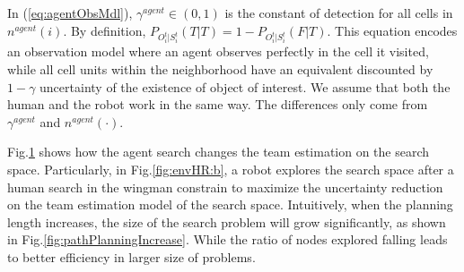 \documentclass[12pt]{article}
\begin{document}
In (\ref{eq:agentObsMdl}), $ \gamma^{agent} \in (0,1) $ is the constant of detection for all cells in $ n^{agent}(i) $. By definition, $ P_{O_{i}^{t}|S_{i}^{t}}(T|T) = 1 - P_{O_{i}^{t}|S_{i}^{t}}(F|T) $. This equation encodes an observation model where an agent observes perfectly in the cell it visited, while all cell units within the neighborhood have an equivalent discounted by $ 1-\gamma $ uncertainty of the existence of object of interest. We assume that both the human and the robot work in the same way. The differences only come from $ \gamma^{agent} $ and $ n^{agent}(\cdot) $.

\begin{figure} 
  \centering 
  \caption{} 
  \label{fig:envHR} %
\end{figure}

Fig.\ref{fig:envHR} shows how the agent search changes the team estimation on the search space. Particularly, in Fig.\ref{fig:envHR:b}, a robot explores the search space after a human search in the wingman constrain to maximize the uncertainty reduction on the team estimation model of the search space. Intuitively, when the planning length increases, the size of the search problem will grow significantly, as shown in Fig.\ref{fig:pathPlanningIncrease}. While the ratio of nodes explored falling leads to better efficiency in larger size of problems.
\end{document}
